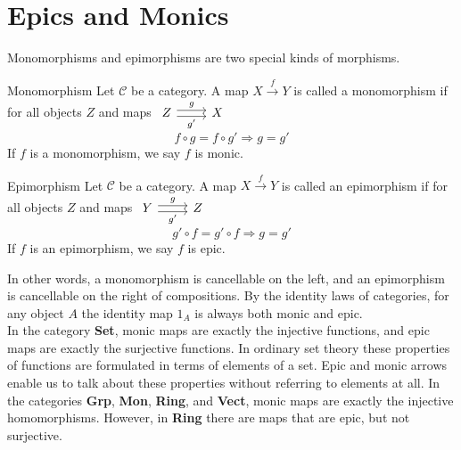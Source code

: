 \section {Epics and Monics}

Monomorphisms and epimorphisms are two special kinds of morphisms.

\begin{definition}{Monomorphism}
  Let $\mathscr{C}$ be a category. A map $X \overset{f}{\to} Y$ is called a monomorphism if for all objects $Z$ and maps
  $
  \begin{tikzcd}
    Z \arrow[r,shift left, "g"] \arrow[r,shift right,swap,"g'"] & X
  \end{tikzcd}
  $
  \[
    f \circ g = f \circ g' \Rightarrow g = g'
  \]
  If $f$ is a monomorphism, we say $f$ is monic.
\end{definition}

\begin{definition}{Epimorphism}
  Let $\mathscr{C}$ be a category. A map $X \overset{f}{\to} Y$ is called an epimorphism if for all objects $Z$ and maps
  $
  \begin{tikzcd}
    Y \arrow[r,shift left, "g"] \arrow[r,shift right,swap,"g'"] & Z
  \end{tikzcd}
  $
  \[
    g' \circ f = g' \circ f \Rightarrow g = g'
  \]
  If $f$ is an epimorphism, we say $f$ is epic.
\end{definition}


In other words, a monomorphism is cancellable on the left, and an epimorphism is cancellable on the right of compositions.
By the identity laws of categories, for any object $A$ the identity map $1_A$ is always both monic and epic.\\
In the category \textbf{Set}, monic maps are exactly the injective functions, and epic maps are exactly the surjective functions.
In ordinary set theory these properties of functions are formulated in terms of elements of a set.
Epic and monic arrows enable us to talk about these properties without referring to elements at all.
In the categories \textbf{Grp}, \textbf{Mon}, \textbf{Ring}, and \textbf{Vect}, monic maps are exactly the injective homomorphisms.
However, in \textbf{Ring} there are maps that are epic, but not surjective.

